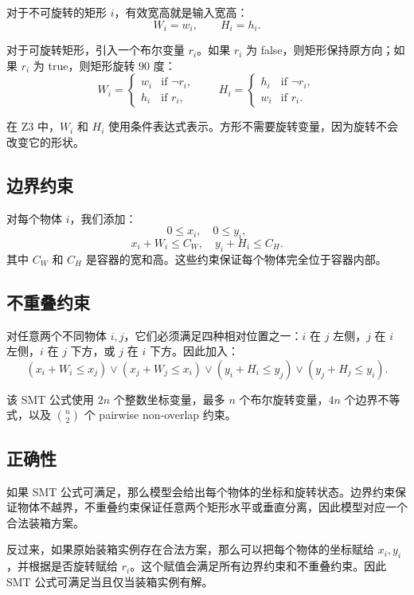 \documentclass[UTF8,11pt]{ctexart}
\begin{document}
对于不可旋转的矩形 \(i\)，有效宽高就是输入宽高：
\[
W_i=w_i,\qquad H_i=h_i.
\]

对于可旋转矩形，引入一个布尔变量 \(r_i\)。如果 \(r_i\) 为 false，则矩形保持原方向；如果 \(r_i\) 为 true，则矩形旋转 90 度：
\[
W_i =
\begin{cases}
w_i & \text{if } \neg r_i,\\
h_i & \text{if } r_i,
\end{cases}
\qquad
H_i =
\begin{cases}
h_i & \text{if } \neg r_i,\\
w_i & \text{if } r_i.
\end{cases}
\]

在 Z3 中，\(W_i\) 和 \(H_i\) 使用条件表达式表示。方形不需要旋转变量，因为旋转不会改变它的形状。

\subsection{边界约束}

对每个物体 \(i\)，我们添加：
\[
0 \leq x_i,\quad 0 \leq y_i,
\]
\[
x_i+W_i \leq C_W,\quad y_i+H_i \leq C_H.
\]
其中 \(C_W\) 和 \(C_H\) 是容器的宽和高。这些约束保证每个物体完全位于容器内部。

\subsection{不重叠约束}

对任意两个不同物体 \(i,j\)，它们必须满足四种相对位置之一：\(i\) 在 \(j\) 左侧，\(j\) 在 \(i\) 左侧，\(i\) 在 \(j\) 下方，或 \(j\) 在 \(i\) 下方。因此加入：
\[
(x_i+W_i \leq x_j)
\vee
(x_j+W_j \leq x_i)
\vee
(y_i+H_i \leq y_j)
\vee
(y_j+H_j \leq y_i).
\]

该 SMT 公式使用 \(2n\) 个整数坐标变量，最多 \(n\) 个布尔旋转变量，\(4n\) 个边界不等式，以及 \(\binom{n}{2}\) 个 pairwise non-overlap 约束。

\subsection{正确性}

如果 SMT 公式可满足，那么模型会给出每个物体的坐标和旋转状态。边界约束保证物体不越界，不重叠约束保证任意两个矩形水平或垂直分离，因此模型对应一个合法装箱方案。

反过来，如果原始装箱实例存在合法方案，那么可以把每个物体的坐标赋给 \(x_i,y_i\)，并根据是否旋转赋给 \(r_i\)。这个赋值会满足所有边界约束和不重叠约束。因此 SMT 公式可满足当且仅当装箱实例有解。
\end{document}

